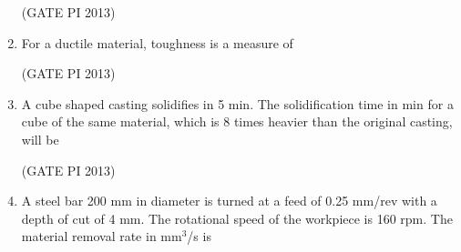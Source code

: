 \documentclass[journal,12pt,onecolumn]{IEEEtran}
\theoremstyle{remark}
\begin{document}
\begin{enumerate}
\begin{enumerate}
\end{enumerate}

\hfill (GATE PI 2013)

\newpage
\item For a ductile material, toughness is a measure of
\begin{enumerate}
\end{enumerate}

\hfill (GATE PI 2013)

\item A cube shaped casting solidifies in 5 min. The solidification time in min for a cube of the same material, which is 8 times heavier than the original casting, will be \\

\begin{enumerate}
\end{enumerate}

\hfill (GATE PI 2013)

\item A steel bar 200 mm in diameter is turned at a feed of 0.25 mm/rev with a depth of cut of 4 mm. The rotational speed of the workpiece is 160 rpm. The material removal rate in mm$^3$/s is \\

\begin{enumerate}
\end{enumerate}


\end{enumerate}
\end{document}

